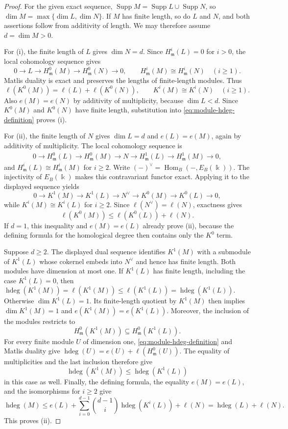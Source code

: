 \documentclass[11pt,reqno]{amsart}
\numberwithin{equation}{section}
\theoremstyle{definition}
\newcommand{\m}{\mathfrak m}
\newcommand{\hdeg}{\operatorname{hdeg}}
\begin{document}
\begin{proof}
For the given exact sequence,
$\operatorname{Supp}M=\operatorname{Supp}L\cup\operatorname{Supp}N$,
so $\dim M=\max\{\dim L,\dim N\}$. If $M$ has finite length, so
do $L$ and $N$, and both assertions follow from additivity of length.
We may therefore assume $d=\dim M>0$.

For \textup{(i)}, the finite length of $L$ gives $\dim N=d$.
Since $H^i_{\m}(L)=0$ for $i>0$, the local cohomology sequence gives
\[
 0\longrightarrow L\longrightarrow H^0_{\m}(M)
 \longrightarrow H^0_{\m}(N)\longrightarrow0,
 \qquad H^i_{\m}(M)\cong H^i_{\m}(N)\quad(i\ge1).
\]
Matlis duality is exact and preserves the lengths of finite-length
modules. Thus
\[
 \ell(K^0(M))=\ell(L)+\ell(K^0(N)),\qquad
 K^i(M)\cong K^i(N)\quad(i\ge1).
\]
Also $e(M)=e(N)$ by additivity of multiplicity, because
$\dim L<d$. Since $K^0(M)$ and $K^0(N)$ have finite length,
substitution into \eqref{eq:module-hdeg-definition} proves
\textup{(i)}.

For \textup{(ii)}, the finite length of $N$ gives $\dim L=d$ and
$e(L)=e(M)$, again by additivity of multiplicity. The local
cohomology sequence is
\[
 \begin{aligned}
 0\longrightarrow H^0_{\m}(L)\longrightarrow H^0_{\m}(M)
 \longrightarrow N\longrightarrow H^1_{\m}(L)
 \longrightarrow H^1_{\m}(M)\longrightarrow0,
 \end{aligned}
\]
and $H^i_{\m}(L)\cong H^i_{\m}(M)$ for $i\ge2$.
Write $(-)^{\vee}=\operatorname{Hom}_B(-,E_B(\Bbbk))$.
The injectivity of $E_B(\Bbbk)$ makes this contravariant functor
exact. Applying it to the displayed sequence yields
\[
 0\longrightarrow K^1(M)\longrightarrow K^1(L)
 \longrightarrow N^{\vee}\longrightarrow K^0(M)
 \longrightarrow K^0(L)\longrightarrow0,
\]
while $K^i(M)\cong K^i(L)$ for $i\ge2$.
Since $\ell(N^{\vee})=\ell(N)$, exactness gives
\[
 \ell(K^0(M))\leq\ell(K^0(L))+\ell(N).
\]
If $d=1$, this inequality and $e(M)=e(L)$ already prove
\textup{(ii)}, because the defining formula for the homological
degree then contains only the $K^0$ term.

Suppose $d\ge2$. The displayed dual sequence identifies $K^1(M)$
with a submodule of $K^1(L)$ whose cokernel embeds into
$N^{\vee}$ and hence has finite length. Both modules have dimension
at most one. If $K^1(L)$ has finite length, including the case
$K^1(L)=0$, then
$\hdeg(K^1(M))=\ell(K^1(M))\le\ell(K^1(L))=\hdeg(K^1(L))$.
Otherwise $\dim K^1(L)=1$. Its finite-length quotient by $K^1(M)$
then implies $\dim K^1(M)=1$ and
$e(K^1(M))=e(K^1(L))$. Moreover, the inclusion of the modules
restricts to
\[
 H^0_{\m}(K^1(M))\subseteq H^0_{\m}(K^1(L)).
\]
For every finite module $U$ of dimension one,
\eqref{eq:module-hdeg-definition} and Matlis duality give
$\hdeg(U)=e(U)+\ell(H^0_{\m}(U))$.
The equality of multiplicities and the last inclusion therefore give
\[
 \hdeg(K^1(M))\leq\hdeg(K^1(L))
\]
in this case as well. Finally, the defining formula, the equality
$e(M)=e(L)$, and the isomorphisms for $i\ge2$ give
\[
 \hdeg(M)\le e(L)+\sum_{i=0}^{d-1}\binom{d-1}{i}\hdeg(K^i(L))+\ell(N)
           =\hdeg(L)+\ell(N).
\]
This proves \textup{(ii)}.
\end{proof}
\end{document}
